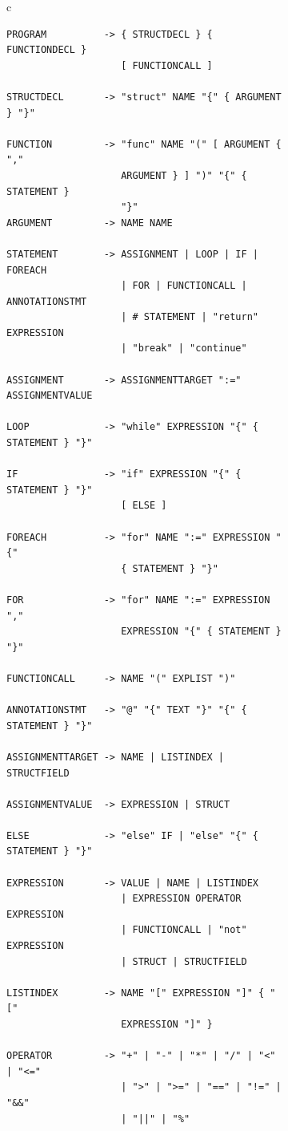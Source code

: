 \begin{figure}
    \begin{subfigure}[ht]{1\linewidth}
        \begin{tabular}{c}
            \begin{lstlisting}
PROGRAM          -> { STRUCTDECL } { FUNCTIONDECL }
                    [ FUNCTIONCALL ]

STRUCTDECL       -> "struct" NAME "{" { ARGUMENT } "}"

FUNCTION         -> "func" NAME "(" [ ARGUMENT { ","
                    ARGUMENT } ] ")" "{" { STATEMENT }
                    "}"
ARGUMENT         -> NAME NAME

STATEMENT        -> ASSIGNMENT | LOOP | IF | FOREACH
                    | FOR | FUNCTIONCALL | ANNOTATIONSTMT
                    | # STATEMENT | "return" EXPRESSION
                    | "break" | "continue"

ASSIGNMENT       -> ASSIGNMENTTARGET ":=" ASSIGNMENTVALUE

LOOP             -> "while" EXPRESSION "{" { STATEMENT } "}"

IF               -> "if" EXPRESSION "{" { STATEMENT } "}"
                    [ ELSE ]

FOREACH          -> "for" NAME ":=" EXPRESSION "{"
                    { STATEMENT } "}"

FOR              -> "for" NAME ":=" EXPRESSION ","
                    EXPRESSION "{" { STATEMENT } "}"

FUNCTIONCALL     -> NAME "(" EXPLIST ")"

ANNOTATIONSTMT   -> "@" "{" TEXT "}" "{" { STATEMENT } "}"

ASSIGNMENTTARGET -> NAME | LISTINDEX | STRUCTFIELD

ASSIGNMENTVALUE  -> EXPRESSION | STRUCT

ELSE             -> "else" IF | "else" "{" { STATEMENT } "}"

EXPRESSION       -> VALUE | NAME | LISTINDEX
                    | EXPRESSION OPERATOR EXPRESSION
                    | FUNCTIONCALL | "not" EXPRESSION
                    | STRUCT | STRUCTFIELD

LISTINDEX        -> NAME "[" EXPRESSION "]" { "["
                    EXPRESSION "]" }

OPERATOR         -> "+" | "-" | "*" | "/" | "<" | "<="
                    | ">" | ">=" | "==" | "!=" | "&&"
                    | "||" | "%"

            \end{lstlisting}
        \end{tabular}
    \end{subfigure}
    \label{fig:gourmet-grammer1}
\end{figure}

